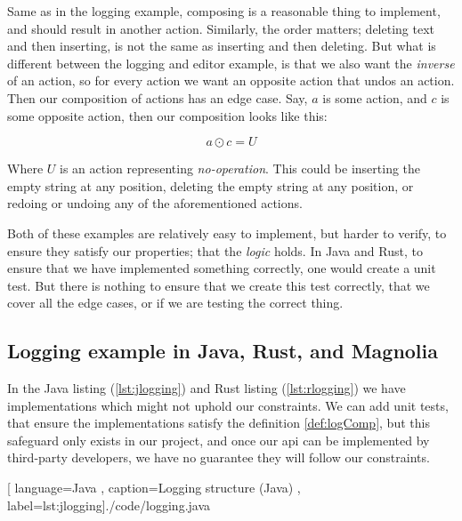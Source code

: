 Same as in the logging example, composing is a reasonable thing to implement,
and should result in another action. Similarly, the order matters; deleting text
and then inserting, is not the same as inserting and then deleting. But what is
different between the logging and editor example, is that we also want the
\textit{inverse} of an action, so for every action we want an opposite action
that undos an action. Then our composition of actions has an edge case. Say, $a$
is some action, and $c$ is some opposite action, then our composition looks like
this:

\begin{definition} \label{def:actComp}
  \begin{equation}
    a \odot c = U
  \end{equation}
\end{definition}

Where $U$ is an action representing \textit{no-operation}. This could be
inserting the empty string at any position, deleting the empty string at any
position, or redoing or undoing any of the aforementioned actions.

Both of these examples are relatively easy to implement, but harder to verify,
to ensure they satisfy our properties; that the \textit{logic} holds. In Java
and Rust, to ensure that we have implemented something correctly, one would
create a unit test. But there is nothing to ensure that we create this test
correctly, that we cover all the edge cases, or if we are testing the correct
thing.

\subsection{Logging example in Java, Rust, and Magnolia}

In the Java listing (\ref{lst:jlogging}) and Rust listing (\ref{lst:rlogging})
we have implementations which might not uphold our constraints. We can add unit
tests, that ensure the implementations satisfy the definition \ref{def:logComp},
but this safeguard only exists in our project, and once our \gls*{api} can be
implemented by third-party developers, we have no guarantee they will follow our
constraints.

\begin{center}
  
    [ language=Java
    , caption={Logging structure (Java)}
    , label=lst:jlogging]{./code/logging.java}
\end{center}

